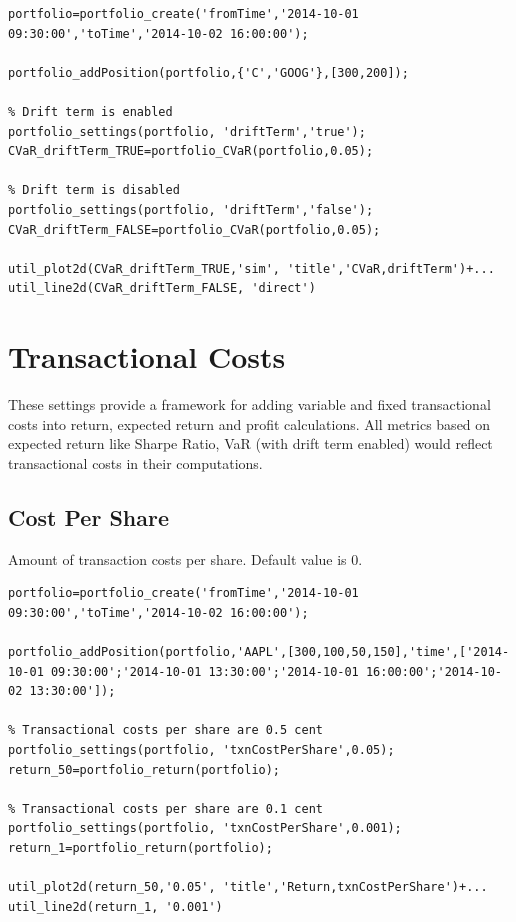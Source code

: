\documentclass[letterpaper]{report}
\begin{document}
\begin{lstlisting}
portfolio=portfolio_create('fromTime','2014-10-01 09:30:00','toTime','2014-10-02 16:00:00');

portfolio_addPosition(portfolio,{'C','GOOG'},[300,200]);

% Drift term is enabled
portfolio_settings(portfolio, 'driftTerm','true');
CVaR_driftTerm_TRUE=portfolio_CVaR(portfolio,0.05);

% Drift term is disabled
portfolio_settings(portfolio, 'driftTerm','false');
CVaR_driftTerm_FALSE=portfolio_CVaR(portfolio,0.05);

util_plot2d(CVaR_driftTerm_TRUE,'sim', 'title','CVaR,driftTerm')+...
util_line2d(CVaR_driftTerm_FALSE, 'direct')
\end{lstlisting}

\section{Transactional Costs}
These settings provide a framework for adding variable and fixed transactional costs into return, expected return and profit calculations.
All metrics based on expected return like Sharpe Ratio, VaR (with drift term
enabled) would reflect transactional costs in their computations.
\subsection{Cost Per Share}
Amount of transaction costs per share. Default value is 0.
\begin{lstlisting}
portfolio=portfolio_create('fromTime','2014-10-01 09:30:00','toTime','2014-10-02 16:00:00');

portfolio_addPosition(portfolio,'AAPL',[300,100,50,150],'time',['2014-10-01 09:30:00';'2014-10-01 13:30:00';'2014-10-01 16:00:00';'2014-10-02 13:30:00']);

% Transactional costs per share are 0.5 cent 
portfolio_settings(portfolio, 'txnCostPerShare',0.05);
return_50=portfolio_return(portfolio);

% Transactional costs per share are 0.1 cent 
portfolio_settings(portfolio, 'txnCostPerShare',0.001);
return_1=portfolio_return(portfolio);

util_plot2d(return_50,'0.05', 'title','Return,txnCostPerShare')+...
util_line2d(return_1, '0.001')
\end{lstlisting}
\end{document}
